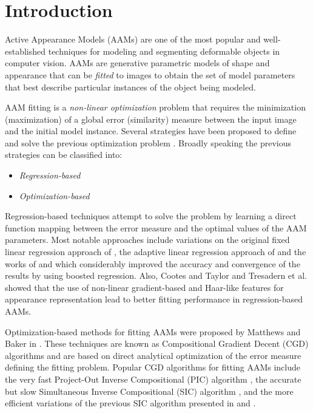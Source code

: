 \section{Introduction}
\label{sec:intro}

Active Appearance Models (AAMs) \cite{Cootes2001, Matthews2004} are one of the most popular and well-established techniques for modeling and segmenting deformable objects in computer vision. AAMs are generative parametric models of shape and appearance that can be \emph{fitted} to images to obtain the set of model parameters that best describe particular instances of the object being modeled.

AAM fitting is a \emph{non-linear optimization} problem that requires the  minimization (maximization) of a global error (similarity) measure between the input image and the initial model instance. Several strategies have been proposed to define and solve the previous optimization problem \cite{Cootes2001, Hou2001, Matthews2004, Batur2005, Gross2005, Donner2006, Papandreou2008, Liu2009, Saragih2009, Amberg2009, Tresadern2010, Martins2010, Sauer2011, Tzimiropoulos2013, Kossaifi2014, Antonakos2014}. Broadly speaking the previous strategies can be classified into: 
\begin{itemize}
\item \emph{Regression-based} \cite{Cootes2001, Hou2001, Batur2005, Donner2006, Liu2009, Saragih2009, Tresadern2010, Sauer2011, Xiong2013}
\item \emph{Optimization-based} \cite{Matthews2004, Gross2005, Papandreou2008, Amberg2009, Martins2010, Tzimiropoulos2013, Kossaifi2014}
\end{itemize}

Regression-based techniques attempt to solve the problem by learning a direct function mapping between the error measure and the optimal values of the AAM parameters. Most notable approaches include variations on the original fixed linear regression approach of \cite{Cootes2001, Hou2001, Donner2006}, the adaptive linear regression approach of \cite{Batur2005} and the works of \cite{Saragih2009} and \cite{Tresadern2010} which considerably improved the accuracy and convergence of the results by using boosted regression. Also, Cootes and Taylor \cite{Cootes2001b} and Tresadern et al. \cite{Tresadern2010} showed that the use of non-linear gradient-based and Haar-like features for appearance representation lead to better fitting performance in regression-based AAMs. 

Optimization-based methods for fitting AAMs were proposed by Matthews and Baker in \cite{Matthews2004}. These techniques are known as Compositional Gradient Decent (CGD) algorithms and are based on direct analytical optimization of the error measure defining the fitting problem. Popular CGD algorithms for fitting AAMs include the very fast Project-Out Inverse Compositional (PIC) algorithm \cite{Matthews2004}, the accurate but slow Simultaneous Inverse Compositional (SIC) algorithm \cite{Gross2005}, and the more efficient variations of the previous SIC algorithm presented in \cite{Papandreou2008} and \cite{ Tzimiropoulos2013}. 

